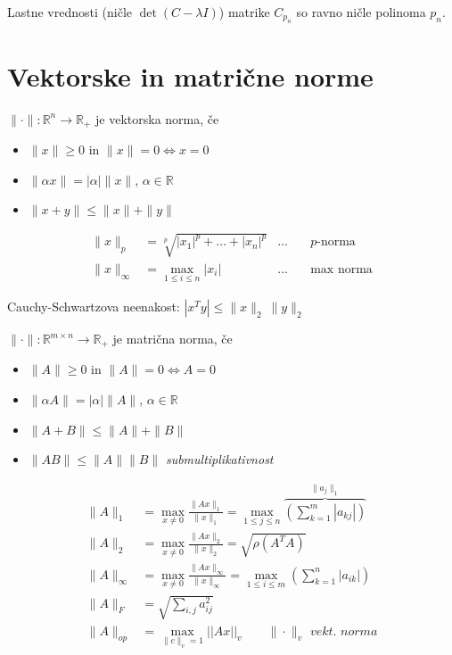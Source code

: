 \begin{multicols}{4}
Lastne vrednosti (ničle $\det(C-\lambda I)$) matrike $C_{p_n}$ so ravno ničle polinoma $p_n$.

\section{Vektorske in matrične norme}
$\|\cdot \| : \mathbb{R}^n \to \mathbb{R}_+$ je vektorska norma, če
\begin{itemize}
	\item $\| x \| \geq 0$ in $\| x \| = 0 \iff x = 0$
	\item $\| \alpha x \| = |\alpha| \| x \|$, $\alpha \in \mathbb{R}$
	\item $\| x + y \| \leq \| x \| + \| y \|$
\end{itemize}

\begin{align*}
	\| x\|_p &= \sqrt[p]{|x_1|^p + \dots + |x_n|^p} & \dots \quad & p\text{-norma} \\
	\| x \|_\infty &= \max\limits_{1 \leq i \leq n} |x_i| & \dots \quad & \text{max norma}
\end{align*}

Cauchy-Schwartzova neenakost: $|x^T y| \leq \|x\|_2\ \|y\|_2$

$\|\cdot \| : \mathbb{R}^{m \times n} \to \mathbb{R}_+$ je matrična norma, če
\begin{itemize}
	\item $\| A \| \geq 0$ in $\| A \| = 0 \iff A = 0$
	\item $\| \alpha A \| = |\alpha| \| A \|$, $\alpha \in \mathbb{R}$
	\item $\| A + B \| \leq \| A \| + \| B \|$
	\item $\| A  B \| \leq \| A \|  \| B \|$ \textit{submultiplikativnost}
\end{itemize}

\begin{align*}
	\| A \|_1 &= \max_{x\neq 0} \frac{\| Ax\|_1}{\|x\|_1} = \max_{1 \leq j \leq n} \overbrace{\left( \sum_{k=1}^m |a_{kj}| \right)}^{\| a_j\|_1}\\
	\| A \|_2 &= \max_{x\neq 0} \frac{\| Ax\|_2}{\|x\|_2} =\sqrt{\rho (A^T A)} \\
	\| A \|_\infty &= \max_{x\neq 0} \frac{\| Ax\|_\infty}{\|x\|_\infty} = \max\limits_{1 \leq i \leq m} \left( \sum_{k=1}^n |a_{ik}| \right) \\
	\| A \|_F &= \sqrt{\sum_{i,j} a_{ij}^2}\\
	\| A \|_{op} &= \max_{\|c\|_v = 1} || A x ||_v \qquad \textit{$\|\cdot \|_v$ vekt. norma}
\end{align*}


\end{multicols}
